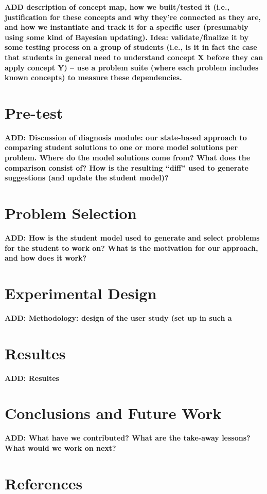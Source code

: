 \documentclass[twocolumn]{article}
\newcommand{\fix}[1]{{\bf #1}}
\begin{document}
\fix{ADD description of concept map, how we built/tested it 
(i.e., justification for these concepts and why they're
connected as they are, and how we instantiate and track it for a
specific user (presumably using some kind of Bayesian updating).  
Idea:  validate/finalize it by some testing process on
a group of students (i.e., is it in fact the case that students in
general need to understand concept X before they can apply concept Y)
-- use a problem suite (where each problem includes known concepts)
to measure these dependencies.} 


\section{Pre-test}
\label{sec:diagnosis}

\fix{ADD:  Discussion of diagnosis module:  our state-based
approach to comparing student solutions to one or more model
solutions per problem.  Where do the model solutions come from?
What does the comparison consist of?  How is the resulting
``diff'' used to generate suggestions (and update the student model)?}


\section{Problem Selection}
\label{sec:prob-selection}

\fix{ADD: How is the student model used to generate and select
  problems for the student to work on?  What is the motivation for our
  approach, and how does it work?}

\section{Experimental Design}
\label{sec:exper-design}

\fix{ADD:  Methodology:  design of the user study (set up in such a}

\section{Resultes}
\label{sec: resultes}

\fix{ADD: Resultes}


\section{Conclusions and Future Work}
\label{conclusions}

\fix{ADD:  What have we contributed?  What are the take-away lessons?
  What would we work on next?}

\section*{References}
\end{document}
